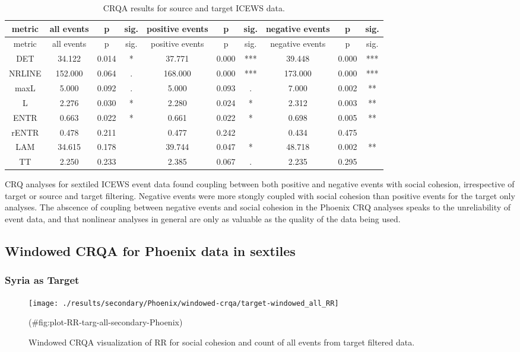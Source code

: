 \begin{appendix}
\begin{longtable}[]{@{}cccccccccc@{}}
\caption{CRQA results for source and target ICEWS data.}\tabularnewline
\toprule
metric & all events & p & sig. & positive events & p & sig. & negative
events & p & sig.\tabularnewline
\midrule
\endfirsthead
\toprule
metric & all events & p & sig. & positive events & p & sig. & negative
events & p & sig.\tabularnewline
\midrule
\endhead
DET & 34.122 & 0.014 & * & 37.771 & 0.000 & *** & 39.448 & 0.000 &
***\tabularnewline
NRLINE & 152.000 & 0.064 & . & 168.000 & 0.000 & *** & 173.000 & 0.000 &
***\tabularnewline
maxL & 5.000 & 0.092 & . & 5.000 & 0.093 & . & 7.000 & 0.002 &
**\tabularnewline
L & 2.276 & 0.030 & * & 2.280 & 0.024 & * & 2.312 & 0.003 &
**\tabularnewline
ENTR & 0.663 & 0.022 & * & 0.661 & 0.022 & * & 0.698 & 0.005 &
**\tabularnewline
rENTR & 0.478 & 0.211 & & 0.477 & 0.242 & & 0.434 & 0.475
&\tabularnewline
LAM & 34.615 & 0.178 & & 39.744 & 0.047 & * & 48.718 & 0.002 &
**\tabularnewline
TT & 2.250 & 0.233 & & 2.385 & 0.067 & . & 2.235 & 0.295
&\tabularnewline
\bottomrule
\end{longtable}

CRQ analyses for sextiled ICEWS event data found coupling between both
positive and negative events with social cohesion, irrespective of
target or source and target filtering. Negative events were more stongly
coupled with social cohesion than positive events for the target only
analyses. The abscence of coupling between negative events and social
cohesion in the Phoenix CRQ analyses speaks to the unreliability of
event data, and that nonlinear analyses in general are only as valuable
as the quality of the data being used.

\hypertarget{windowed-crqa-for-phoenix-data-in-sextiles}{%
\subsection{Windowed CRQA for Phoenix data in
sextiles}\label{windowed-crqa-for-phoenix-data-in-sextiles}}

\hypertarget{syria-as-target}{%
\subsubsection{Syria as Target}\label{syria-as-target}}

\begin{figure}
\texttt{[image: ./results/secondary/Phoenix/windowed-crqa/target-windowed\_all\_RR]} \caption{Windowed CRQA visualization of RR for social cohesion and count of all events from target filtered data.}(\#fig:plot-RR-targ-all-secondary-Phoenix)
\end{figure}


\end{appendix}
